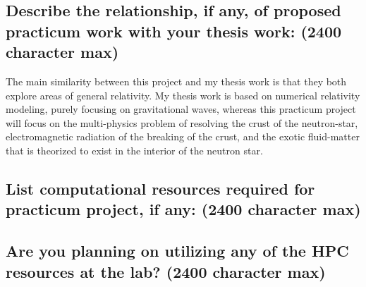\documentclass[12pt]{article}
\newcommand{\todo}[1]{{\color{red}{\it $\langle$todo$\rangle$} #1}}
\begin{document}
\subsection*{Describe the relationship, if any, of proposed practicum work
with your thesis work: (2400 character max)}

The main similarity between this project and my thesis work is that they both explore
areas of general relativity. My thesis work is based on numerical relativity modeling, purely focusing on gravitational waves, whereas this practicum project will focus on the multi-physics problem of resolving the crust of the neutron-star, electromagnetic radiation of the breaking of the crust, and the exotic fluid-matter that is theorized to exist in the interior of the neutron star. 

\subsection*{List computational resources required for practicum project, if
any: (2400 character max)}

\todo{}

\subsection*{Are you planning on utilizing any of the HPC resources at the
lab? (2400 character max)}

\todo{}
\end{document}
